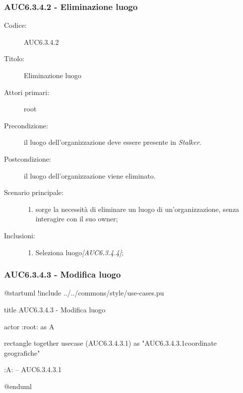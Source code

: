 \documentclass[casi-duso]{subfiles}
\begin{document}
\subsubsection{AUC6.3.4.2 - Eliminazione luogo}%
\label{subsub:AUC6.3.4.2}
\begin{description}
  \item[Codice:] AUC6.3.4.2
  \item[Titolo:] Eliminazione luogo
  \item[Attori primari:] root
  \item[Precondizione:] il luogo dell'organizzazione deve essere presente in \emph{Stalker}.
  \item[Postcondizione:] il luogo dell'organizzazione viene eliminato.
  \item[Scenario principale:]
  \begin{enumerate}
    \item sorge la necessità di eliminare un luogo di un'organizzazione, senza interagire con il suo owner;
  \end{enumerate}
  \item[Inclusioni:]
  \begin{enumerate}
    \item Seleziona luogo\emph{[AUC6.3.4.4]};
  \end{enumerate}
\end{description}

\subsubsection{AUC6.3.4.3 - Modifica luogo}%
\label{subsub:AUC6.3.4.3}

\begin{plantuml}
@startuml 
!include ../../commons/style/use-cases.pu

title AUC6.3.4.3 - Modifica luogo

actor :root: as A

rectangle {
  together {
    usecase (AUC6.3.4.3.1) as "AUC6.3.4.3.1\nModifica coordinate geografiche"
  }
}

:A: -- AUC6.3.4.3.1

@enduml
\end{plantuml}
\end{document}
